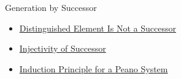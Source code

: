 \begin{topicbox}{Generation by Successor}
\begin{dependencies}
\begin{itemize}
  \item \hyperref[ax:peano-base-not-successor]{Distinguished Element Is Not a Successor}
  \item \hyperref[ax:peano-successor-injective]{Injectivity of Successor}
  \item \hyperref[thm:induction-principle-for-peano-system]{Induction Principle for a Peano System}
\end{itemize}
\end{dependencies}
\end{topicbox}
